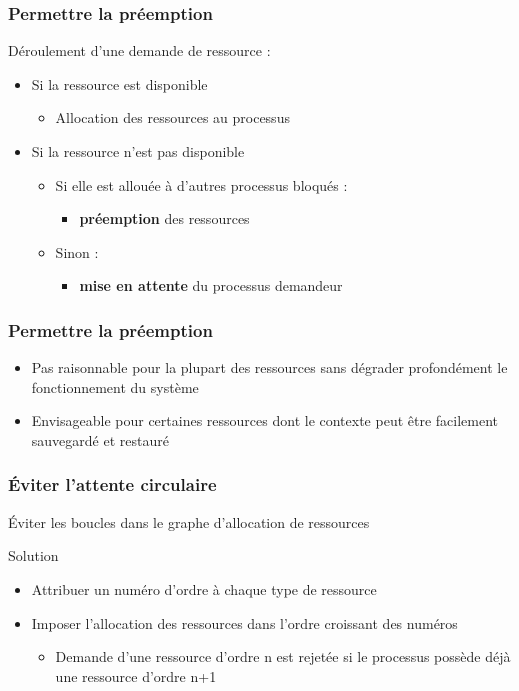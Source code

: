 \begin{frame}
\frametitle{Permettre la préemption}
Déroulement d'une demande de ressource :
\begin{itemize}
\item <1->Si la ressource est disponible
\begin{itemize}\item Allocation des ressources au processus\end{itemize}
\item <2->Si la ressource n'est pas disponible
\begin{itemize}
\item <3->Si elle est allouée à d’autres processus bloqués : 
\begin{itemize}\item \textbf{préemption} des ressources\end{itemize}
\item <4->Sinon : 
\begin{itemize}\item \textbf{mise en attente} du processus demandeur\end{itemize}
\end{itemize}
\end{itemize}
\end{frame}

\begin{frame}
\frametitle{Permettre la préemption}
\begin{itemize}
\item Pas raisonnable pour la plupart des ressources sans dégrader profondément le fonctionnement du système
\item Envisageable pour certaines ressources dont le contexte peut être facilement sauvegardé et restauré
\end{itemize}
\end{frame}

\begin{frame}
\frametitle{Éviter l’attente circulaire}
Éviter les boucles dans le graphe d’allocation de ressources
\begin{block}{Solution}
\begin{itemize}
\item Attribuer un numéro d’ordre à chaque type de ressource
\item Imposer l’allocation des ressources dans l’ordre croissant des numéros
\begin{itemize}
\item Demande d’une ressource d’ordre n est rejetée si le processus possède déjà une ressource d’ordre n+1
\end{itemize}
\end{itemize}
\end{block}
\end{frame}

